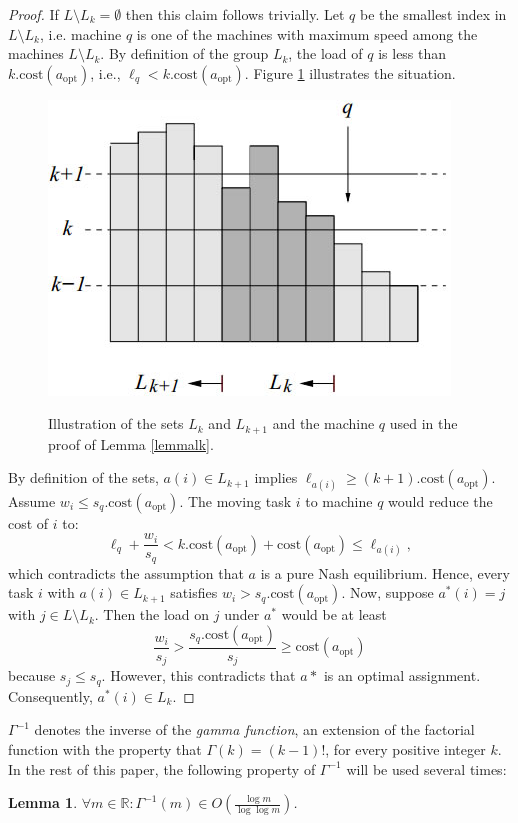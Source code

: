 \documentclass[a4paper,11pt]{article}
\newtheorem{lemma}[theorem]{Lemma}
\newcommand{\R}{{\mathbb R}}
\newcommand{\cost}{\text{cost}}
\newcommand{\opt}{\text{opt}}
\newcommand{\copt}{\cost(a_{\opt})}
\begin{document}
\begin{proof}
If $L\setminus L_k = \emptyset$ then this claim follows trivially. Let $q$ be the smallest index in $L\setminus L_k$, i.e. machine $q$ is one of the machines with maximum speed among the machines $L\setminus L_k$. By definition of the group $L_k$, the load of $q$ is less than $k.\copt$, i.e., $\ell_q < k.\copt$. Figure \ref{lk2} illustrates the situation. \\
\begin{figure}
  \centering
  \includegraphics[scale=0.5]{lk2.jpg}\\
  \caption{Illustration of the sets $L_{k}$ and $L_{k+1}$ and the machine $q$ used in the proof of Lemma \ref{lemmalk}.}
  \label{lk2}
\end{figure}
By definition of the sets, $a(i) \in L_{k+1}$ implies $\ell_{a(i)} \geq (k+1).\copt$. Assume $w_i \leq s_q.\copt$. The moving task $i$ to machine $q$ would reduce the cost of $i$ to:
$$\ell_q + \frac{w_i}{s_q} < k.\copt + \copt \leq \ell_{a(i)},$$
which contradicts the assumption that $a$ is a pure Nash equilibrium. Hence, every task $i$ with $a(i) \in L_{k+1}$  satisfies $w_i > s_q.\copt$. Now, suppose $a^*(i) = j$ with $j \in L\setminus L_k$. Then the load on $j$ under $a^*$ would be at least
$$\frac{w_i}{s_j} > \frac{s_q.\copt}{s_j}\geq\copt$$
because $s_j \leq s_q$. However, this contradicts that $a*$ is an optimal assignment. Consequently, $a^*(i) \in L_k$.
\end{proof}
$\Gamma^{-1}$ denotes the inverse of the \emph{gamma function}, an extension of the factorial function with the property that $\Gamma(k) = (k-1)!$, for every positive integer $k$. In the rest of this paper, the following property of $\Gamma^{-1}$ will be used several times:
\begin{lemma}
$\forall m \in \R: \Gamma^{-1}(m) \in O\left(\frac{\log m}{\log \log m}\right)$.
\end{lemma}
\end{document}
